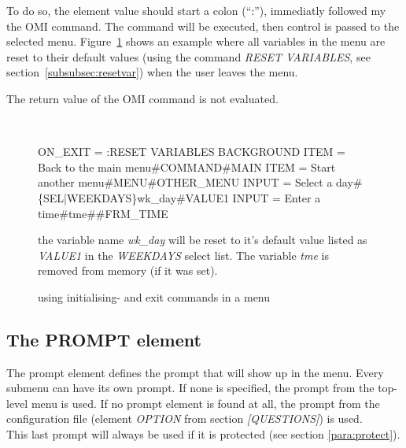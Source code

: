 \documentclass[a4paper]{book}
\renewcommand{\indent}{\hspace*{5mm}}
\begin{document}
To do so, the element value should start a colon (``:''), immediatly followed my the OMI command.
The command will be executed, then control is passed to the selected menu. Figure~\ref{fig:iecmds}
shows an example where all variables in the menu are reset to their default values (using the
command \textsl{RESET VARIABLES}, see section~\ref{subsubsec:resetvar}) when the user leaves the
menu.

The return value of the OMI command is not evaluated.

\begin{figure}[h!tb]
\begin{minipage}[h!tb]{\textwidth}
\hrulefill \\
\begin{ttfamily}\begin{small}
 \newline
\indent ON{\_}EXIT = :RESET VARIABLES BACKGROUND \newline
\indent ITEM  = Back to the main menu{\#}COMMAND{\#}MAIN \newline
\indent ITEM  = Start another menu{\#}MENU{\#}OTHER{\_}MENU \newline
\indent INPUT = Select a day\#\{SEL|WEEKDAYS\}wk\_day\#VALUE1 \newline
\indent INPUT = Enter a time\#tme\#\#FRM\_TIME
\end{small}\end{ttfamily}
\noindent  the variable name \textit{wk\_day} will be reset to it's default value listed as \textit{VALUE1}
in the \textit{WEEKDAYS} select list. The variable \textit{tme} is removed from memory (if it was
set).
\caption{using initialising- and exit commands in a menu}\label{fig:iecmds}
\hrulefill
\end{minipage}
\end{figure}

\subsection{The PROMPT element}
\label{subsubsec:mylabel23}

The prompt element defines the prompt that 
will show up in the menu. Every submenu can have its own prompt. If none is 
specified, the prompt from the top-level menu is used. If no prompt element 
is found at all, the prompt from the configuration file (element \textsl{OPTION} from 
section \textsl{[QUESTIONS]}) is used. \\
This last prompt will always be used if it is protected (see section \ref{para:protect}).
\end{document}
